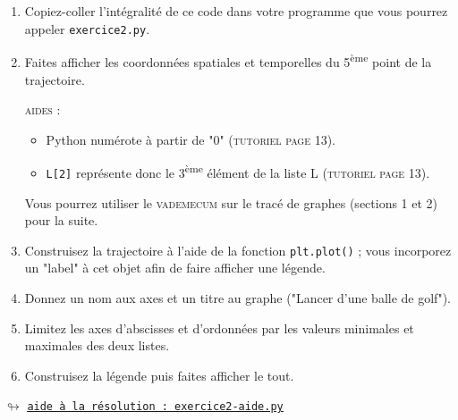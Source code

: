 \documentclass[11pt]{article}
\begin{document}
\begin{enumerate}
\item Copiez-coller l'intégralité de ce code dans votre programme que vous pourrez appeler \texttt{exercice2.py}.

 \item Faites afficher les coordonnées spatiales et temporelles du 5\textsuperscript{ème} point de la trajectoire.
 
 \smallskip
 \textsc{aides : }
\begin{itemize} 
\item Python numérote à partir de "0" (\textsc{tutoriel page 13}).
\item \texttt{L[2]} représente donc le 3\textsuperscript{ème} élément de la liste L (\textsc{tutoriel page 13}).
 \end{itemize}
 
 
 
 
 
 \medskip
 

\begin{center}

Vous pourrez utiliser le \textsc{vademecum} sur le tracé de graphes (sections 1 et 2) pour la suite.
\end{center} 
 
 
 \smallskip
 
 
 \item Construisez la trajectoire à l'aide de la fonction \texttt{plt.plot()} ; vous incorporez un "label" à cet objet afin de faire afficher une légende.
 
 
 \medskip
 
 \item Donnez un nom aux axes et un titre au graphe ("Lancer d'une balle de golf").
 
 \medskip
 
 \item Limitez les axes d'abscisses et d'ordonnées par les valeurs minimales et maximales des deux listes.
 
 \medskip
 \item Construisez la légende puis faites afficher le tout.
 

\end{enumerate}

 
 
 






\begin{center}
 $\looparrowright$ \href{https://github.com/formationPythonPC-Juin/aides-formation/blob/master/exercice2-aide.py}{\underline{\texttt{aide à la résolution : exercice2-aide.py}}}
\end{center}
\end{document}
